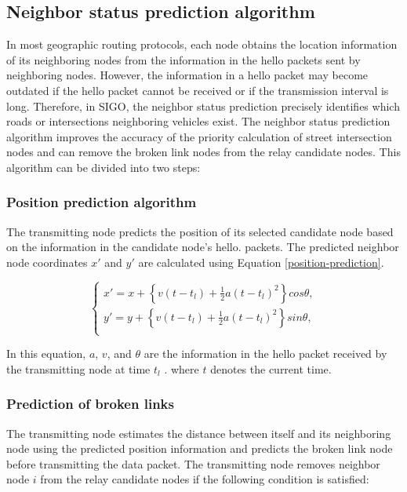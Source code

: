 \documentclass[conference]{IEEEtran}
\begin{document}
\subsection{Neighbor status prediction algorithm}
\label{neighbor_status}
In most geographic routing protocols, each node obtains the location information of its neighboring nodes from the  information in the hello packets sent by neighboring nodes.
However, the information in a hello packet may become outdated if the hello packet cannot be received or if the transmission interval is long.
Therefore, in SIGO, the neighbor status prediction precisely identifies which roads or intersections neighboring vehicles exist. 
The neighbor status prediction algorithm improves the accuracy of the priority calculation of street intersection nodes and can remove the broken link nodes from the relay candidate nodes. This algorithm can be divided into two steps:
\subsubsection{Position prediction algorithm}

The transmitting node predicts the position of its selected candidate  node based on the information in the candidate node's hello.
packets. 
The predicted neighbor node coordinates $x'$ and $y'$ are calculated using Equation \ref{position-prediction}.

\begin{equation}
\label{position-prediction}
\begin{cases}
x' = x + \left\{v(t-t_l) + \frac{1}{2}a(t-t_l)^2\right\}cos\theta, \\
y' = y + \left\{v(t-t_l) + \frac{1}{2}a(t-t_l)^2\right\}sin\theta, \\
\end{cases}
\end{equation}

In this equation, $a$, $v$, and $\theta$ are the information in the hello packet received by the transmitting node at time $t_l$ . where $t$ denotes the current time.

\subsubsection{Prediction of broken links}
The transmitting node estimates the distance between itself and its neighboring node using the predicted position information and predicts the broken link node before transmitting the data packet. The transmitting node removes neighbor node $i$ from the relay candidate nodes if the following condition is satisfied:
\end{document}
